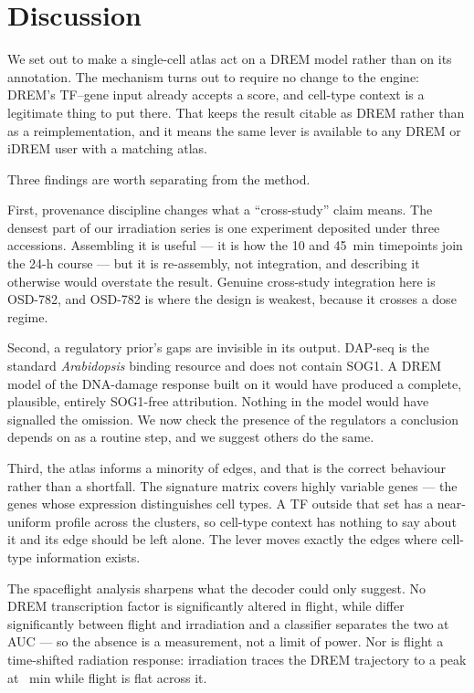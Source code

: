 \section{Discussion}

We set out to make a single-cell atlas act on a DREM model rather than on its
annotation. The mechanism turns out to require no change to the engine: DREM's TF--gene
input already accepts a score, and cell-type context is a legitimate thing to put there.
That keeps the result citable as DREM rather than as a reimplementation, and it means the
same lever is available to any DREM or iDREM user with a matching atlas.

Three findings are worth separating from the method.

First, provenance discipline changes what a ``cross-study'' claim means. The densest part
of our irradiation series is one experiment deposited under three accessions. Assembling
it is useful --- it is how the 10 and 45~min timepoints join the 24-h course --- but it is
re-assembly, not integration, and describing it otherwise would overstate the result.
Genuine cross-study integration here is OSD-782, and OSD-782 is where the design is
weakest, because it crosses a dose regime.

Second, a regulatory prior's gaps are invisible in its output. DAP-seq is the standard
\textit{Arabidopsis} binding resource and does not contain SOG1. A DREM model of the
DNA-damage response built on it would have produced a complete, plausible, entirely
SOG1-free attribution. Nothing in the model would have signalled the omission. We now
check the presence of the regulators a conclusion depends on as a routine step, and we
suggest others do the same.

Third, the atlas informs a minority of edges, and that is the correct behaviour rather
than a shortfall. The signature matrix covers highly variable genes --- the genes whose
expression distinguishes cell types. A TF outside that set has a near-uniform profile
across the \NumAtlasClusters{} clusters, so cell-type context has nothing to say about it
and its edge should be left alone. The lever moves exactly the edges where cell-type
information exists.

The spaceflight analysis sharpens what the decoder could only suggest. No DREM
transcription factor is significantly altered in flight, while \NumTFsSigFlightVsRad{}
differ significantly between flight and irradiation and a classifier separates the two at
AUC \ClfAUC{} --- so the absence is a measurement, not a limit of power. Nor is flight a
time-shifted radiation response: irradiation traces the DREM trajectory to a peak at
\ProjRadPeakTime{}~min while flight is flat across it.

